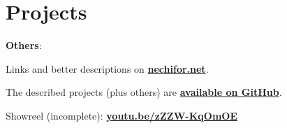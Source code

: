 \documentclass[a4wide]{article}
\newcommand{\primaryColor}[1]{{\color[rgb]{0.92, 0, 0} #1}}
\newcommand{\sub}[1]{\section*{\primaryColor{#1}}}
\begin{document}
\sub{Projects}



\vspace{5mm}

\textbf{Others}:


\vspace*{\fill}

\begin{center}
Links and better descriptions on \href{http://nechifor.net}{\textbf{nechifor.net}}.

The described projects (plus others) are
\href{http://github.com/paul-nechifor}{\textbf{available on GitHub}}.

Showreel (incomplete): \href{http://youtu.be/zZZW-KqOmOE}{\bf youtu.be/zZZW-KqOmOE}
\end{center}
\end{document}

